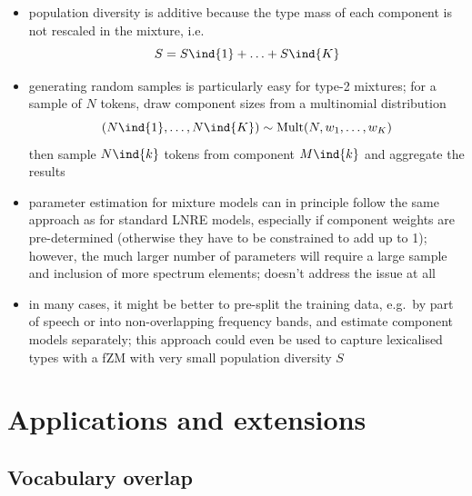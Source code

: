 \documentclass[a4paper]{article}
\begin{document}
\begin{itemize}
\item population diversity is additive because the type mass of each component
  is not rescaled in the mixture, i.e.\
  \begin{equation}
    \label{eq:models:mixtures:population-diversity}
    S = S\ind{1} + \ldots + S\ind{K}
  \end{equation}
\item generating random samples is particularly easy for type-2 mixtures; for
  a sample of $N$ tokens, draw component sizes from a multinomial distribution
  \begin{equation}
    \label{eq:models:mixtures:subsample-multinom}
    (N\ind{1}, \ldots, N\ind{K}) \sim
    \text{Mult}(N, w_1, \ldots, w_K)
  \end{equation}
  then sample $N\ind{k}$ tokens from component $M\ind{k}$ and aggregate the
  results
\item parameter estimation for mixture models can in principle follow the same
  approach as for standard LNRE models, especially if component weights are
  pre-determined (otherwise they have to be constrained to add up to 1);
  however, the much larger number of parameters will require a large sample
  and inclusion of more spectrum elements; \citet[Ch.~4]{Baayen:01} doesn't
  address the issue at all
\item in many cases, it might be better to pre-split the training data, e.g.\
  by part of speech or into non-overlapping frequency bands, and estimate
  component models separately; this approach could even be used to capture
  lexicalised types with a fZM with very small population diversity $S$
\end{itemize}



\section{Applications and extensions}
\label{sec:app}

\subsection{Vocabulary overlap}
\label{sec:app:overlap}
\end{document}
